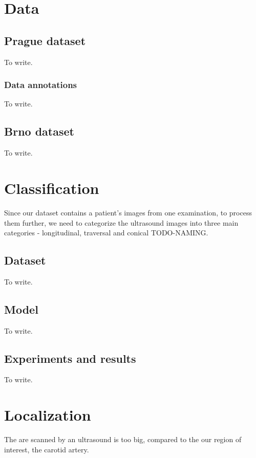 


\chapter{Data}
\section{Prague dataset}
To write.

\subsection{Data annotations}
To write.


\section{Brno dataset}
To write.



\chapter{Classification}
Since our dataset contains a patient's images from one examination, to process
them further, we need to categorize the ultrasound images into three main 
categories - longitudinal, traversal and conical TODO-NAMING.

\section{Dataset}
To write.

\section{Model}
To write.

\section{Experiments and results}
To write.



\chapter{Localization}
The are scanned by an ultrasound is too big, compared to the our region of interest, 
the carotid artery.


